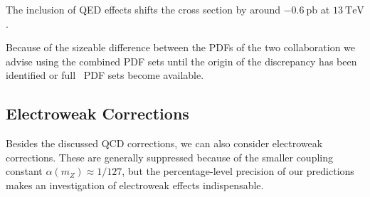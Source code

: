 The inclusion of \acs{QED} effects shifts the cross section by around $-0.6\ \mathrm{pb}$ at $13\ \mathrm{TeV}$.

Because of the sizeable difference between the \acs{PDF}s of the two collaboration we advise using the combined \acs{PDF} sets until the origin of the discrepancy has been identified or full \NNNLO\ \acs{PDF} sets become available.

\subsection{Electroweak Corrections}
Besides the discussed \acs{QCD} corrections, we can also consider electroweak corrections. These are generally suppressed because of the smaller coupling constant $\alpha (m_Z) \approx 1/127$, but the percentage-level precision of our predictions makes an investigation of electroweak effects indispensable.

